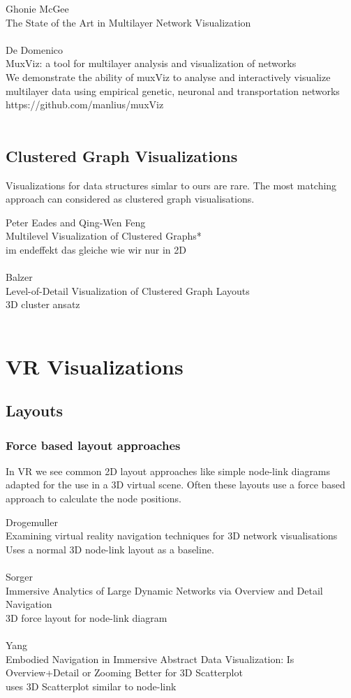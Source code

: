 Ghonie McGee\\
The State of the Art in Multilayer Network Visualization\\
\\
De Domenico\\
MuxViz: a tool for multilayer analysis and visualization of networks\\
We demonstrate the ability of muxViz to analyse and interactively visualize multilayer data using empirical genetic, neuronal and transportation networks https://github.com/manlius/muxViz\\
\\

\subsection{Clustered Graph Visualizations}
Visualizations for data structures simlar to ours are rare. The most matching approach can considered as clustered graph visualisations.

Peter Eades and Qing-Wen Feng\\
Multilevel Visualization of Clustered Graphs*\\
im endeffekt das gleiche wie wir nur in 2D\\
\\
Balzer\\
Level-of-Detail Visualization of Clustered Graph Layouts\\
3D cluster ansatz\\
\\


\section{VR Visualizations}

\subsection{Layouts}

\subsubsection{Force based layout approaches}
In VR we see common 2D layout approaches like simple node-link diagrams adapted for the use in a 3D virtual scene. Often these layouts use a force based approach to calculate the node positions. 

Drogemuller\\
Examining virtual reality navigation techniques for 3D network visualisations\\
Uses a normal 3D node-link layout as a baseline.\\
\\
Sorger\\
Immersive Analytics of Large Dynamic Networks via Overview and Detail Navigation\\
3D force layout for node-link diagram\\
\\
Yang\\
Embodied Navigation in Immersive Abstract Data Visualization:
Is Overview+Detail or Zooming Better for 3D Scatterplot\\
uses 3D Scatterplot similar to node-link
